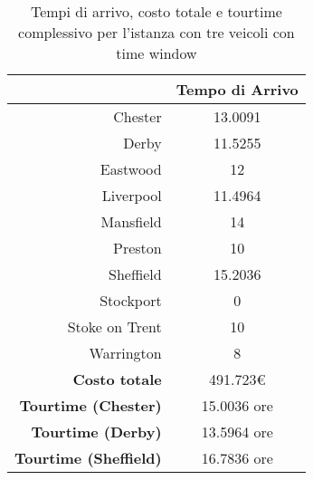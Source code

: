 
		\begin{table}[H]
			\small
			\centering
			\begin{tabular}{rc}

				\toprule
				& Tempo di Arrivo \\

				\midrule
				Chester & 13.0091 \\
				Derby & 11.5255 \\
				Eastwood & 12 \\
				Liverpool & 11.4964 \\
				Mansfield & 14 \\
				Preston  & 10 \\
				Sheffield & 15.2036 \\
				Stockport & 0 \\
				Stoke on Trent & 10 \\
				Warrington & 8 \\


				\midrule
				\textbf{Costo totale} & 491.723€ \\
				\textbf{Tourtime (Chester)} & 15.0036 ore \\
				\textbf{Tourtime (Derby)} & 13.5964 ore \\
				\textbf{Tourtime (Sheffield)} & 16.7836 ore \\
				\bottomrule
			\end{tabular}
			\label{table:instance_5_totale}
			\caption{Tempi di arrivo, costo totale e tourtime complessivo per l'istanza con tre veicoli con time window}
		\end{table}

